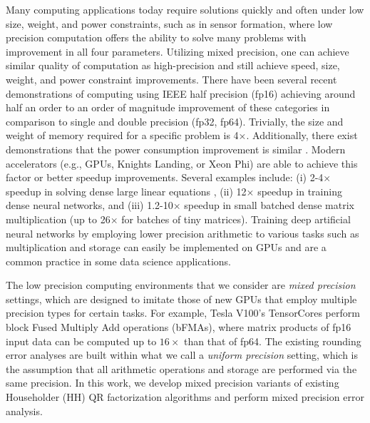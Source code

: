 \documentclass[review,onefignum,onetabnum]{siamart190516}
\begin{document}
Many computing applications today require solutions quickly and often under low size, weight, and power constraints, such as in sensor formation, where
low precision computation offers the ability to solve many problems with improvement in all four parameters.
Utilizing mixed precision, one can achieve similar quality of computation as high-precision and still achieve 
speed, size, weight, and power constraint improvements. 
There have been several recent demonstrations of computing using IEEE half precision (fp16) achieving around half an order to an order of magnitude improvement of these categories in comparison to single and double precision (fp32, fp64).
Trivially, the size and weight of memory required for a specific problem is 4$\times$.
Additionally, there exist demonstrations that the power consumption improvement is similar
\cite{fagan2016powerwall}.
Modern accelerators (e.g., GPUs, Knights Landing, or Xeon Phi) are able to achieve this factor or better speedup improvements.
Several examples include:
(i)   2-4$\times$ speedup in solving dense large linear equations \cite{haidar2018iterative,haidar2019tensorcore},
(ii)  12$\times$ speedup in training dense neural networks,
and
(iii) 1.2-10$\times$ speedup in small batched dense matrix multiplication \cite{abdelfattah2019batched} (up to 26$\times$ for batches of tiny matrices).
Training deep artificial neural networks by employing lower precision arithmetic to various tasks such as multiplication \cite{Courbariaux2014Mult} and storage \cite{Courbariaux2014Storage} can easily be implemented on GPUs and are a common practice in some data science applications.\par

The low precision computing environments that we consider are \emph{mixed precision} settings, which are designed to imitate those of new GPUs that employ multiple precision types for certain tasks. 
For example, Tesla V100's TensorCores perform block Fused Multiply Add operations (bFMAs), where matrix products of fp16 input data can be computed up to $16\times$ than that of fp64.
The existing rounding error analyses are built within what we call a \emph{uniform precision} setting, which is the assumption that all arithmetic operations and storage are performed via the same precision.
In this work, we develop mixed precision variants of existing Householder (HH) QR factorization algorithms and perform mixed precision error analysis. 
\end{document}
